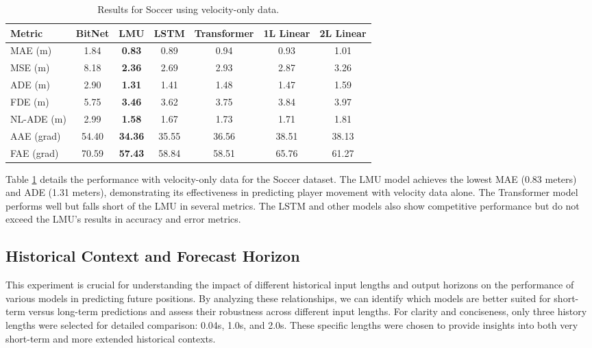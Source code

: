 \begin{table}[H]
\centering
\caption{Results for Soccer using velocity-only data.}
\label{vel:SOC1}
\begin{tabular}{l||c|c|c|c|c|c}
Metric & BitNet & LMU & LSTM & Transformer & 1L Linear & 2L Linear \\
\hline \hline
MAE (m) & 1.84 & \textbf{0.83} & 0.89 & 0.94 & 0.93 & 1.01 \\
MSE (m) & 8.18 & \textbf{2.36} & 2.69 & 2.93 & 2.87 & 3.26 \\
ADE (m) & 2.90 & \textbf{1.31} & 1.41 & 1.48 & 1.47 & 1.59 \\
FDE (m) & 5.75 & \textbf{3.46} & 3.62 & 3.75 & 3.84 & 3.97 \\
NL-ADE (m) & 2.99 & \textbf{1.58} & 1.67 & 1.73 & 1.71 & 1.81 \\
AAE (grad) & 54.40 & \textbf{34.36} & 35.55 & 36.56 & 38.51 & 38.13 \\
FAE (grad) & 70.59 & \textbf{57.43} & 58.84 & 58.51 & 65.76 & 61.27 \\
\end{tabular}
\end{table}

Table \ref{vel:SOC1} details the performance with velocity-only data for the Soccer dataset. The LMU model achieves the lowest MAE (0.83 meters) and ADE (1.31 meters), demonstrating its effectiveness in predicting player movement with velocity data alone. The Transformer model performs well but falls short of the LMU in several metrics. The LSTM and other models also show competitive performance but do not exceed the LMU’s results in accuracy and error metrics.




\subsection{Historical Context and Forecast Horizon}
\label{exp:history_forcast}
This experiment is crucial for understanding the impact of different historical input lengths and output horizons on the performance of various models in predicting future positions. By analyzing these relationships, we can identify which models are better suited for short-term versus long-term predictions and assess their robustness across different input lengths. For clarity and conciseness, only three history lengths were selected for detailed comparison: 0.04s, 1.0s, and 2.0s. These specific lengths were chosen to provide insights into both very short-term and more extended historical contexts.


